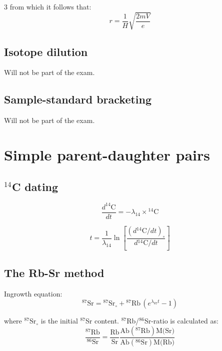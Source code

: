 \documentclass{article}
\begin{document}
\begin{multicols}{3}
from which it follows that:
\begin{equation}
r = \frac{1}{H}\sqrt{\frac{2 m V}{e}}
\label{eq:rH}
\end{equation}

\subsection{Isotope dilution}
\label{sec:isotope-dilution}

Will not be part of the exam.

\subsection{Sample-standard bracketing}
\label{sec:bracketing}

Will not be part of the exam.

\section{Simple parent-daughter pairs}
\label{ch:intro2PD}

\subsection{$^{14}$C dating}
\label{sec:14C}

\begin{equation}
\frac{d^{14}\mbox{C}}{dt} = -\lambda_{14} \times {}^{14}\mbox{C}
\label{eq:d14Cdt}
\end{equation}

\begin{equation}
t = \frac{1}{\lambda_{14}}
\ln\left[\frac{(d{}^{14}\mbox{C}/dt)_\circ}{d{}^{14}\mbox{C}/dt}\right]
\label{eq:t14C}
\end{equation}

\subsection{The Rb-Sr method}
\label{sec:Rb-Sr}

Ingrowth equation:
\begin{equation}
{}^{87}\mbox{Sr} = {}^{87}\mbox{Sr}_\circ + {}^{87}\mbox{Rb} \, (e^{\lambda_{87} t} - 1)
\label{eq:87Sr*}
\end{equation}

where $^{87}\mbox{Sr}_\circ$ is the initial $^{87}$Sr content.
$^{87}$Rb/$^{86}$Sr-ratio is calculated as:
\begin{equation}
\frac{^{87}\mbox{Rb}}{^{86}\mbox{Sr}} =
\frac{\mbox{Rb}}{\mbox{Sr}} \frac{\mbox{Ab}(^{87}\mbox{Rb})
  \mbox{M(Sr)}}{\mbox{Ab}(^{86}\mbox{Sr}) \mbox{M(Rb)}}
\label{eq:87Rb86Sr}
\end{equation}


\end{multicols}
\end{document}
